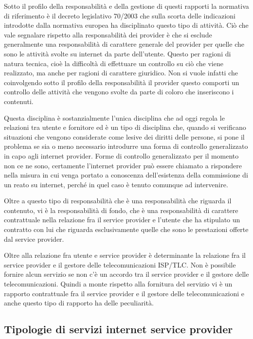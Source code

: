 Sotto il profilo della responsabilità e della gestione di questi rapporti la normativa di riferimento è il decreto legislativo 70/2003 che sulla scorta delle indicazioni introdotte dalla normativa europea ha disciplinato questo tipo di attività. Ciò che vale segnalare rispetto alla responsabilità dei provider è che si esclude generalmente una responsabilità di carattere generale del provider per quelle che sono le attività svolte su internet da parte dell'utente. Questo per ragioni di natura tecnica, cioè la difficoltà di effettuare un controllo su ciò che viene realizzato, ma anche per ragioni di carattere giuridico. Non si vuole infatti che coinvolgendo sotto il profilo della responsabilità il provider questo comporti un controllo delle attività che vengono svolte da parte di coloro che inseriscono i contenuti.

Questa disciplina è sostanzialmente l'unica disciplina che ad oggi regola le relazioni tra utente e fornitore ed è un tipo di disciplina che, quando si verificano situazioni che vengono considerate come lesive dei diritti delle persone, si pone il problema se sia o meno necessario introdurre una forma di controllo generalizzato in capo agli internet provider. 
Forme di controllo generalizzato per il momento non ce ne sono, certamente l'internet provider può essere chiamato a rispondere nella misura in cui venga portato a conoscenza dell'esistenza della commissione di un reato su internet, perché in quel caso è tenuto comunque ad intervenire. 

Oltre a questo tipo di responsabilità che è una responsabilità che riguarda il contenuto, vi è la responsabilità di fondo, che è una responsabilità di carattere contrattuale nella relazione fra il service provider e l'utente che ha stipulato un contratto con lui che riguarda esclusivamente quelle che sono le prestazioni offerte dal service provider. 

Oltre alla relazione fra utente e service provider è determinante la relazione fra il service provider e il gestore delle telecomunicazioni ISP/TLC. Non è possibile fornire alcun servizio se non c'è un accordo tra il service provider e il gestore delle telecomunicazioni. Quindi a monte rispetto alla fornitura del servizio vi è un rapporto contrattuale fra il service provider e il gestore delle telecomunicazioni e anche questo tipo di rapporto ha delle peculiarità. 

\subsection{Tipologie di servizi internet service provider}

